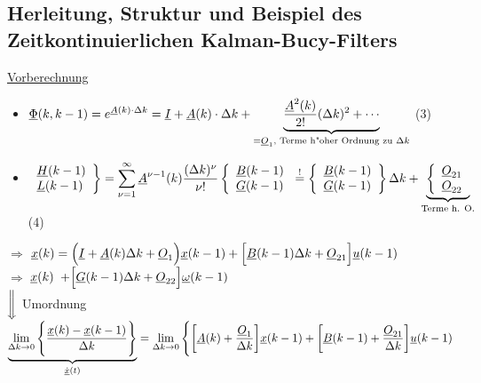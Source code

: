\documentclass[openany,a4paper,11pt]{book}
\begin{document}
\subsection{Herleitung, Struktur und Beispiel des Zeitkontinuierlichen Kalman-Bucy-Filters}
\uline{Vorberechnung} \begin{itemize}
    \item $\displaystyle\uline{\Phi}(k,k-1)=e^{\uline{A}(k)\cdot \Delta k}=\uline{I}+\uline{A}(k)\cdot\Delta k+\underbrace{\frac{\uline{A}^2(k)}{2!}(\Delta k)^2+\cdots}_{=\uline{O}_1 \text{, Terme h"oher Ordnung zu }\Delta k}$  \quad (3)
    \item $\displaystyle\left. \begin{array}{l}
          \uline{H}(k-1) \\ \uline{L}(k-1) \\ \end{array} \right \} =\sum_{\nu=1}^{\infty} \uline{A}^{\nu-1}(k)\frac{(\Delta k)^\nu}{\nu !} \left\{ \begin{array}{l}
          \uline{B}(k-1)\\ \uline{G}(k-1) \\ \end{array} \right. \stackrel{!}{=} \left \{ \begin{array}{l}
          \uline{B}(k-1)\\ \uline{G}(k-1) \\ \end{array} \right \} \Delta k + \underbrace{\left \{ \begin{array}{l}
          \uline{O}_{21}\\ \uline{O}_{22} \\ \end{array} \right.}_{\text{Terme h. O.}} $ \quad (4)
\end{itemize}
$\Rightarrow$ \quad $\uline{x}(k)=\Big(\uline{I}+\uline{A}(k)\Delta k +\uline{O}_1\Big)\uline{x}(k-1)+\Big[\uline{B}(k-1)\Delta k+\uline{O}_{21}\Big]\uline{u}(k-1)$\\
{\color{white}$\Rightarrow$ \quad $\uline{x}(k)$} $+\Big[\uline{G}(k-1)\Delta k+\uline{O}_{22}\Big]\uline{\omega}(k-1)$\\
\qquad $\bigg\Downarrow$ Umordnung\\
$\displaystyle\underbrace{\mathop{\text{lim}}\limits_{\Delta k\rightarrow0}\Bigg\{\frac{\uline{x}(k)-\uline{x}(k-1)}{\Delta k}\Bigg\}}_{\uline{\dot{x}}(t)}=\mathop{\text{lim}}\limits_{\Delta k\rightarrow0}\Bigg\{\bigg[\uline{A}(k)+\frac{\uline{O}_1}{\Delta k}\bigg]\uline{x}(k-1)+\bigg[\uline{B}(k-1)+\frac{\uline{O}_{21}}{\Delta k}\bigg]\uline{u}(k-1)$\\
\end{document}
